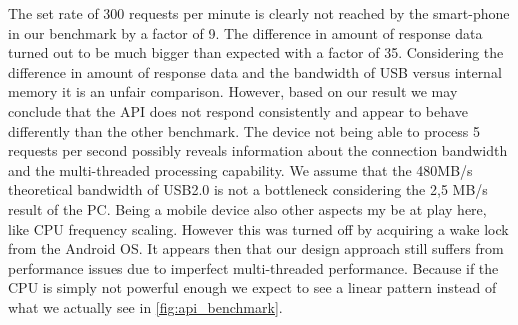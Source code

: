 The set rate of 300 requests per minute is clearly not reached by the smart-phone in our benchmark by a factor of 9.
The difference in amount of response data turned out to be much bigger than expected with a factor of 35.
Considering the difference in amount of response data and the bandwidth of USB versus internal memory it is an unfair comparison.
However, based on our result we may conclude that the API does not respond consistently and appear to behave differently than the other benchmark.
The device not being able to process 5 requests per second possibly reveals information about the connection bandwidth and the multi-threaded processing capability.
We assume that the 480MB/s theoretical bandwidth of USB2.0 is not a bottleneck considering the 2,5 MB/s result of the PC.
Being a mobile device also other aspects my be at play here, like CPU frequency scaling.
However this was turned off by acquiring a wake lock from the Android OS.
It appears then that our design approach still suffers from performance issues due to imperfect multi-threaded performance.
Because if the CPU is simply not powerful enough we expect to see a linear pattern instead of what we actually see in \ref{fig:api_benchmark}.


